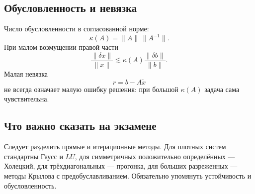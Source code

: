 \subsection{Обусловленность и невязка}

Число обусловленности в согласованной норме:
\[
    \kappa(A)=\|A\|\,\|A^{-1}\|.
\]
При малом возмущении правой части
\[
    \frac{\|\delta x\|}{\|x\|}
    \lesssim
    \kappa(A)\frac{\|\delta b\|}{\|b\|}.
\]
Малая невязка
\[
    r=b-A\widetilde x
\]
не всегда означает малую ошибку решения: при большой $\kappa(A)$ задача сама
чувствительна.

\subsection{Что важно сказать на экзамене}

Следует разделить прямые и итерационные методы. Для плотных систем стандартны
Гаусс и $LU$, для симметричных положительно определённых --- Холецкий, для
трёхдиагональных --- прогонка, для больших разреженных --- методы Крылова с
предобуславливанием. Обязательно упомянуть устойчивость и обусловленность.

\newpage